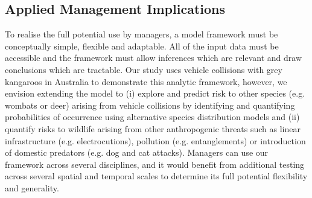 \subsection{Applied Management Implications}
To realise the full potential use by managers, a model framework must be conceptually simple, flexible and adaptable. All of the input data must be accessible and the framework must allow inferences which are relevant and draw conclusions which are tractable. Our study uses vehicle collisions with grey kangaroos in Australia to demonstrate this analytic framework, however, we envision extending the model to (i) explore and predict risk to other species (e.g. wombats or deer) arising from vehicle collisions by identifying and quantifying probabilities of occurrence using alternative species distribution models and (ii) quantify risks to wildlife arising from other anthropogenic threats such as linear infrastructure (e.g. electrocutions), pollution (e.g. entanglements) or introduction of domestic predators (e.g. dog and cat attacks). Managers can use our framework across several disciplines, and it would benefit from additional testing across several spatial and temporal scales to determine its full potential flexibility and generality.